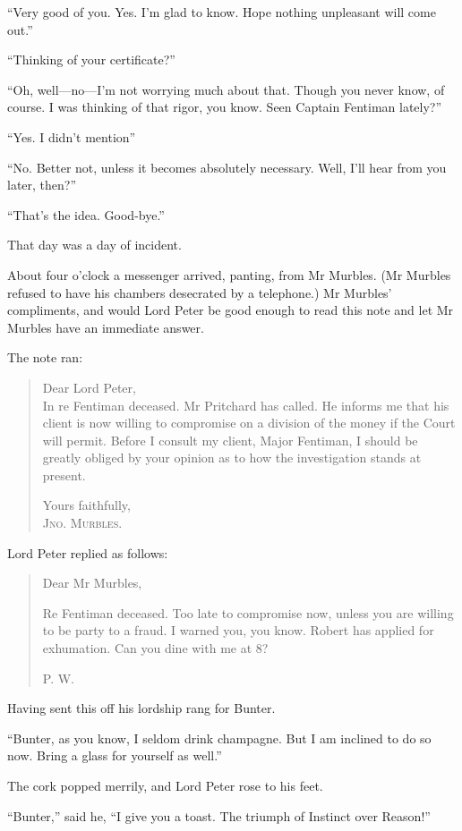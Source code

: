 \enquote{Very good of you. Yes. I'm glad to know. Hope nothing unpleasant will come out.}

\enquote{Thinking of your certificate?}

\enquote{Oh, well\allowbreak---\allowbreak no---I'm not worrying much about that. Though you never know, of course. I was thinking of that rigor, you know. Seen Captain Fentiman lately?}

\enquote{Yes. I didn't mention\longdash}

\enquote{No. Better not, unless it becomes absolutely necessary. Well, I'll hear from you later, then?}

\enquote{That's the idea. Good-bye.}

That day was a day of incident.

About four o'clock a messenger arrived, panting, from Mr Murbles. (Mr Murbles refused to have his chambers desecrated by a telephone.) Mr Murbles' compliments, and would Lord Peter be good enough to read this note and let Mr Murbles have an immediate answer.

The note ran:

\begin{samepage}
\begin{quotation}
\noindent Dear Lord Peter,\\
\nopagebreak[4]
\indent In re Fentiman deceased. Mr Pritchard has called. He informs me that his client is now willing to compromise on a division of the money if the Court will permit. Before I consult my client, Major Fentiman, I should be greatly obliged by your opinion as to how the investigation stands at present.
\begin{flushright}
Yours faithfully,\\
\textsc{Jno. Murbles.}
\end{flushright}
\end{quotation}
\end{samepage}

Lord Peter replied as follows:
\begin{samepage}
\begin{quotation}
\noindent Dear Mr Murbles,

\indent Re Fentiman deceased. Too late to compromise now, unless you are willing to be party to a fraud. I warned you, you know. Robert has applied for exhumation. Can you dine with me at 8?
\begin{flushright}
\textsc{P. W.}
\end{flushright}
\end{quotation}
\end{samepage}

Having sent this off his lordship rang for Bunter.

\enquote{Bunter, as you know, I seldom drink champagne. But I am inclined to do so now. Bring a glass for yourself as well.}

The cork popped merrily, and Lord Peter rose to his feet.

\enquote{Bunter,} said he, \enquote{I give you a toast. The triumph of Instinct over Reason!}